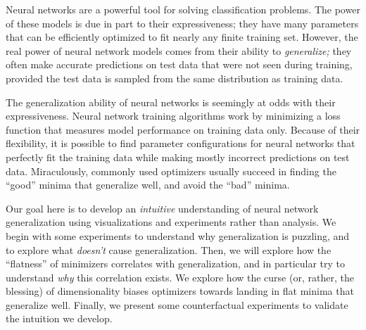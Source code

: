 \documentclass{article}
\newcommand{\tom}[1]{{  \textcolor{red}{\bf \em [Tom: #1]}}}
\begin{document}
    Neural networks are a powerful tool for solving classification problems.  The power of these models is due in part to their expressiveness;  they have many parameters that can be efficiently optimized to fit nearly any finite training set.  However, the real power of neural network models comes from their ability to {\em generalize;}   they often make accurate predictions on test data that were not seen during training, provided the test data is sampled from the same distribution as training data.

    The generalization ability of neural networks is seemingly at odds with their expressiveness.
    Neural network training algorithms work by minimizing a loss function that measures model performance on training data only.
      Because of their flexibility, it is possible to find parameter configurations for neural networks that perfectly fit the training data while making mostly incorrect predictions on test data.  Miraculously, commonly used optimizers usually succeed in finding the ``good'' minima that generalize well, and avoid the ``bad'' minima.


      Our goal here is to develop an {\em intuitive} understanding of neural network generalization using visualizations and experiments rather than analysis.  We begin with some experiments to understand why generalization is puzzling, and to explore what {\em doesn't} cause generalization.  Then, we will explore how the ``flatness'' of minimizers correlates with generalization, and in particular try to understand {\em why} this correlation exists.  We explore how the curse (or, rather, the blessing) of dimensionality biases optimizers towards landing in flat minima that generalize well.  Finally, we present some counterfactual experiments to validate the intuition we develop.
\end{document}
